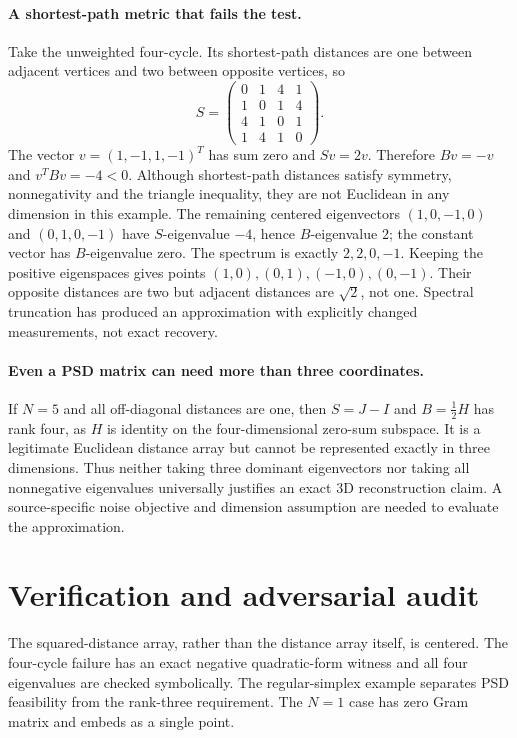 \documentclass[11pt]{article}
\begin{document}
\paragraph{A shortest-path metric that fails the test.}
Take the unweighted four-cycle. Its shortest-path distances are one between
adjacent vertices and two between opposite vertices, so
\[
 S=\begin{pmatrix}0&1&4&1\\1&0&1&4\\4&1&0&1\\1&4&1&0\end{pmatrix}.
\]
The vector $v=(1,-1,1,-1)^T$ has sum zero and $Sv=2v$.
Therefore $Bv=-v$ and $v^TBv=-4<0$.
Although shortest-path distances satisfy symmetry, nonnegativity and the triangle
inequality, they are not Euclidean in any dimension in this example.
The remaining centered eigenvectors $(1,0,-1,0)$ and $(0,1,0,-1)$ have
$S$-eigenvalue $-4$, hence $B$-eigenvalue $2$; the constant vector has
$B$-eigenvalue zero. The spectrum is exactly $2,2,0,-1$.
Keeping the positive eigenspaces gives points
$(1,0),(0,1),(-1,0),(0,-1)$. Their opposite distances are two but adjacent
distances are $\sqrt2$, not one. Spectral truncation has produced an
approximation with explicitly changed measurements, not exact recovery.

\paragraph{Even a PSD matrix can need more than three coordinates.}
If $N=5$ and all off-diagonal distances are one, then $S=J-I$ and
$B=\frac12H$ has rank four, as $H$ is identity on the four-dimensional
zero-sum subspace. It is a legitimate Euclidean distance array but cannot be
represented exactly in three dimensions. Thus neither taking three dominant
eigenvectors nor taking all nonnegative eigenvalues universally justifies an
exact 3D reconstruction claim. A source-specific noise objective and dimension
assumption are needed to evaluate the approximation.

\section{Verification and adversarial audit}

The squared-distance array, rather than the distance array itself, is centered.
The four-cycle failure has an exact negative quadratic-form witness and all
four eigenvalues are checked symbolically. The regular-simplex example separates
PSD feasibility from the rank-three requirement. The $N=1$ case has zero
Gram matrix and embeds as a single point.
\end{document}

